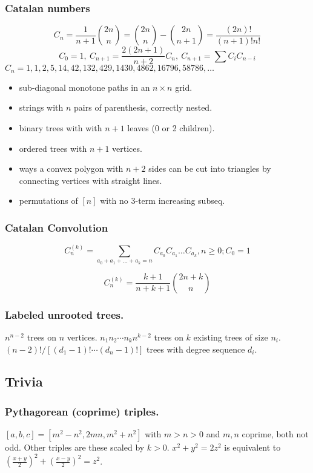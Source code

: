 \begin{small}
  \subsubsection{Catalan numbers}
    \[ C_n=\frac{1}{n+1}\binom{2n}{n}= \binom{2n}{n}-\binom{2n}{n+1} = \frac{(2n)!}{(n+1)!n!} \]
    \[ C_0=1,\ C_{n+1} = \frac{2(2n+1)}{n+2}C_n,\ C_{n+1}=\sum C_iC_{n-i} \]
    ${C_n = 1, 1, 2, 5, 14, 42, 132, 429, 1430, 4862, 16796, 58786, \dots}$
    \begin{itemize}[noitemsep]
      \item sub-diagonal monotone paths in an $n\times n$ grid.
      \item strings with $n$ pairs of parenthesis, correctly nested.
      \item binary trees with with $n+1$ leaves (0 or 2 children).
      \item ordered trees with $n+1$ vertices.
      \item ways a convex polygon with $n+2$ sides can be cut into triangles by connecting vertices with straight lines.
      \item permutations of $[n]$ with no 3-term increasing subseq.

      \end{itemize}

  \subsubsection{Catalan Convolution}
  $$C_{n}^{(k)} = \sum _{a_{0} + a_{1} + \ldots + a_{k} = n} C_{a_{0}}C_{a_{1}}\ldots C_{a_{k}}, n \geq 0; C_0 = 1 $$

  $$C_{n}^{(k)} = \frac{k + 1}{n + k + 1} {2n + k \choose n}$$

  \subsubsection{Labeled unrooted trees.} $n^{n-2}$ trees on $n$ vertices. $n_1 n_2\cdots n_k n^{k-2}$ trees on $k$ existing trees of size $n_i$. $(n-2)!/[(d_1 -1)!\cdots (d_n-1)!]$ trees with degree sequence $d_i$. 

\subsection{Trivia}
\subsubsection{Pythagorean (coprime) triples.} $[a,b,c]=[m^2-n^2,2mn,m^2+n^2]$ with $m>n>0$ and $m,n$ coprime, both not odd. Other triples are these scaled by $k>0$. $x^2+y^2=2z^2$ is equivalent to $(\frac{x+y}{2})^2+(\frac{x-y}{2})^2=z^2$. 


\end{small}
